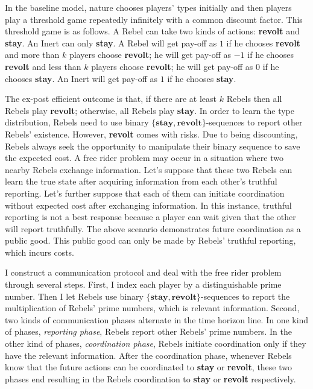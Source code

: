 \documentclass[12pt]{article}
\theoremstyle{definition}
\theoremstyle{remark}
\theoremstyle{claim}
\begin{document}
In the baseline model, nature chooses players' types initially and then players play a threshold game repeatedly infinitely  with a common discount factor. This threshold game is as follows.  A Rebel can take two kinds of actions: \textbf{revolt} and \textbf{stay}. An Inert can only \textbf{stay}. A Rebel will get pay-off as $1$ if he chooses \textbf{revolt} and more than $k$ players choose \textbf{revolt}; he will get pay-off as $-1$ if he chooses \textbf{revolt} and less than $k$ players choose \textbf{revolt}; he will get pay-off as $0$ if he chooses \textbf{stay}. An Inert will get pay-off as $1$ if he chooses \textbf{stay}. 


The ex-post efficient outcome is that, if there are at least $k$ Rebels then all Rebels play \textbf{revolt}; otherwise, all Rebels play \textbf{stay}. In order to learn the type distribution, Rebels need to use binary $\{\textbf{stay},\textbf{revolt}\}$-sequences to report other Rebels' existence. However, \textbf{revolt} comes with risks. Due to being discounting, Rebels always seek the opportunity to manipulate their binary sequence to save the expected cost. A free rider problem may occur in a situation where two nearby Rebels exchange information. Let's suppose that these two Rebels can learn the true state after acquiring information from each other's truthful reporting. Let's further suppose that each of them can initiate coordination without expected cost after exchanging information. In this instance, truthful reporting is not a best response because a player can wait given that the other will report truthfully. The above scenario demonstrates future coordination as a public good. This public good can only be made by Rebels' truthful reporting, which incurs costs. 

I construct a communication protocol and deal with the free rider problem through several steps. First, I index each player by a distinguishable prime number. Then I let Rebels use binary $\{\textbf{stay},\textbf{revolt}\}$-sequences to report the multiplication of Rebels' prime numbers, which is relevant information. Second, two kinds of communication phases alternate in the time horizon line. In one kind of phases, \textit{reporting phase}, Rebels report other Rebels' prime numbers. In the other kind of phases, \textit{coordination phase}, Rebels initiate coordination only if they have the relevant information. After the coordination phase, whenever Rebels know that the future actions can be coordinated to \textbf{stay} or \textbf{revolt}, these two phases end resulting in the Rebels coordination to \textbf{stay} or \textbf{revolt} respectively.
\end{document}
